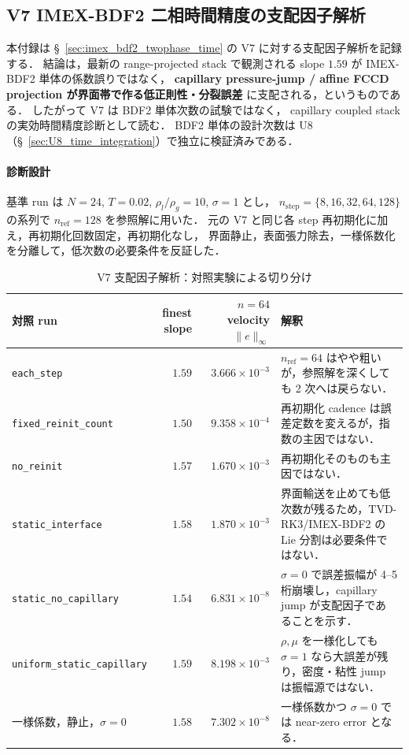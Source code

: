 \subsection{V7 IMEX-BDF2 二相時間精度の支配因子解析}
\label{app:v7_imex_bdf2_rca}

本付録は §~\ref{sec:imex_bdf2_twophase_time} の V7 に対する支配因子解析を記録する．
結論は，最新の range-projected stack で観測される slope $1.59$ が
IMEX-BDF2 単体の係数誤りではなく，
\textbf{capillary pressure-jump / affine FCCD projection が界面帯で作る低正則性・分裂誤差}
に支配される，というものである．
したがって V7 は BDF2 単体次数の試験ではなく，
capillary coupled stack の実効時間精度診断として読む．
BDF2 単体の設計次数は U8（§~\ref{sec:U8_time_integration}）で独立に検証済みである．

\paragraph{診断設計}

基準 run は $N=24$, $T=0.02$, $\rho_l/\rho_g=10$, $\sigma=1$ とし，
$n_{\mathrm{step}}=\{8,16,32,64,128\}$ の系列で
$n_{\mathrm{ref}}=128$ を参照解に用いた．
元の V7 と同じ各 step 再初期化に加え，再初期化回数固定，再初期化なし，
界面静止，表面張力除去，一様係数化を分離して，低次数の必要条件を反証した．

\begin{table}[htbp]
\centering\scriptsize
\caption{V7 支配因子解析：対照実験による切り分け}
\label{tab:v7_rca_controls}
\begin{tabularx}{\linewidth}{>{\raggedright\arraybackslash}p{34mm}r r X}
\toprule
対照 run & finest slope & $n=64$ velocity $\|e\|_\infty$ & 解釈 \\
\midrule
\texttt{each\_step} & $1.59$ & $3.666\times10^{-3}$ &
$n_{\mathrm{ref}}=64$ はやや粗いが，参照解を深くしても 2 次へは戻らない．\\
\texttt{fixed\_reinit\_count} & $1.50$ & $9.358\times10^{-4}$ &
再初期化 cadence は誤差定数を変えるが，指数の主因ではない．\\
\texttt{no\_reinit} & $1.57$ & $1.670\times10^{-3}$ &
再初期化そのものも主因ではない．\\
\texttt{static\_interface} & $1.58$ & $1.870\times10^{-3}$ &
界面輸送を止めても低次数が残るため，TVD-RK3/IMEX-BDF2 の Lie 分割は必要条件ではない．\\
\texttt{static\_no\_capillary} & $1.54$ & $6.831\times10^{-8}$ &
$\sigma=0$ で誤差振幅が 4--5 桁崩壊し，capillary jump が支配因子であることを示す．\\
\texttt{uniform\_static\_capillary} & $1.59$ & $8.198\times10^{-3}$ &
$\rho,\mu$ を一様化しても $\sigma=1$ なら大誤差が残り，密度・粘性 jump は振幅源ではない．\\
一様係数，静止，$\sigma=0$ & $1.58$ & $7.302\times10^{-8}$ &
一様係数かつ $\sigma=0$ では near-zero error となる．\\
\bottomrule
\end{tabularx}
\end{table}

